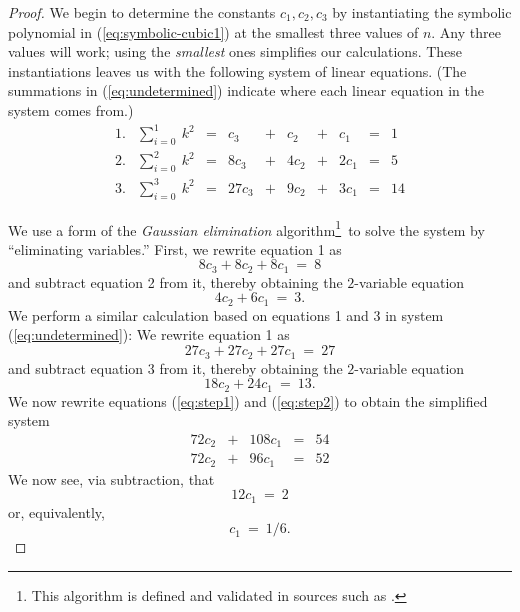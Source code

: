{\begin{proof}
We begin to determine the constants $c_1, c_2, c_3$ by instantiating the symbolic polynomial in (\ref{eq:symbolic-cubic1}) at the smallest three values of $n$.  Any three values will work; using
the {\em smallest} ones simplifies our calculations.  These instantiations leaves us with the following system of linear equations.  (The summations in (\ref{eq:undetermined}) indicate where
each linear equation in the system comes from.)
\begin{equation}
\label{eq:undetermined}
\begin{array}{lccccccccc}
1. &
{\displaystyle \sum_{i=0}^1 \ k^2}
   & = & c_3    & + & c_2   & + & c_1   & = & 1 \\
2. &
{\displaystyle \sum_{i=0}^2 \ k^2}
   & = & 8 c_3  & + & 4 c_2 & + & 2 c_1 & = & 5 \\
3. &
{\displaystyle \sum_{i=0}^3 \ k^2}
   & = & 27 c_3 & + & 9 c_2 & + & 3 c_1 & = & 14
\end{array}
\end{equation}

We use a form of the {\it Gaussian elimination} algorithm\footnote{This algorithm is defined and validated in sources such as \cite{CLRS}.}~to solve the system by ``eliminating variables.''  First, we rewrite equation 1 as
\[ 8 c_3 + 8 c_2 + 8 c_1 \ = \ 8 \]
and subtract equation 2 from it, thereby obtaining the $2$-variable equation
\begin{equation}
\label{eq:step1}
4c_2 + 6 c_1 \ = \ 3.
\end{equation}
We perform a similar calculation based on equations 1 and 3 in system (\ref{eq:undetermined}):  We rewrite equation 1 as
\[ 27 c_3 + 27 c_2 + 27 c_1 \ = \ 27 \]
and subtract equation 3 from it, thereby obtaining the $2$-variable equation
\begin{equation}
\label{eq:step2}
18 c_2 + 24 c_1 \ = \ 13.
\end{equation}
We now rewrite equations (\ref{eq:step1}) and (\ref{eq:step2}) to obtain the simplified system
\[
\begin{array}{ccccc}
72 c_2 & + & 108 c_1 & = & 54 \\
72 c_2 & + &  96 c_1 & = & 52
\end{array}
\]
We now see, via subtraction, that
\[ 12 c_1 \ = \ 2 \]
or, equivalently,
\begin{equation}
\label{eq:valueof-c1}
c_1 \ = \ 1/6.
\end{equation}


\end{proof}}
